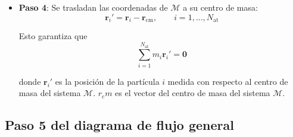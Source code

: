 \begin{itemize}
		
		\item \textbf{Paso 4}: Se trasladan las coordenadas de $\mathcal{M}$ a su centro de masa:
		\begin{equation}
			\mathbf{r}_i' = \mathbf{r}_i - \mathbf{r}_{\text{cm}}, \qquad
			i=1,\dots,N_{\text{at}}
		\end{equation}
		
		Esto garantiza que
		\begin{equation}
			\sum_{i=1}^{N_{\text{at}}} m_i \mathbf{r}_i' = \mathbf{0}
		\end{equation} 
		
		donde $\mathbf{r}_i'$ es la posición de la partícula $i$ medida 
		con respecto al centro de masa del sistema $\mathcal{M}$. 
		$r_cm$ es el vector del centro de masa del sistema $\mathcal{M}$.
		
		
	\end{itemize}


	\subsection{Paso 5 del diagrama de flujo general}
	
